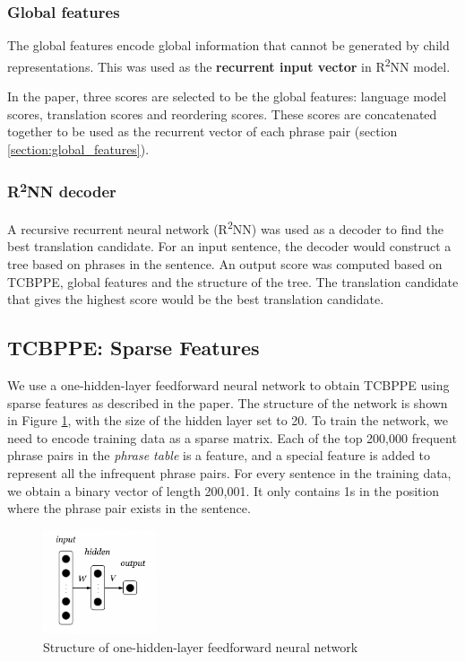 \documentclass[12pt,a4paper,twoside,openright]{report}
\begin{document}
\subsubsection{Global features}
The global features encode global information that cannot be generated by child representations. This was used as the \textbf{recurrent input vector} in R\textsuperscript{2}NN model. 

In the paper\cite{r2nn}, three scores are selected to be the global features: language model scores, translation scores and reordering scores. These scores are concatenated together to be used as the recurrent vector of each phrase pair (section \ref{section:global_features}).

\subsubsection{R\textsuperscript{2}NN decoder}
A recursive recurrent neural network (R\textsuperscript{2}NN) was used as a decoder to find the best translation candidate. For an input sentence, the decoder would construct a tree based on phrases in the sentence. An output score was computed based on TCBPPE, global features and the structure of the tree. The translation candidate that gives the highest score would be the best translation candidate.

\subsection{TCBPPE: Sparse Features} \label{section:TCBPPE_sparse}

We use a one-hidden-layer feedforward neural network to obtain TCBPPE using sparse features as described in the paper\cite{r2nn}. The structure of the network is shown in Figure \ref{fig:one_hidden_layer}, with the size of the hidden layer set to 20. To train the network, we need to encode training data as a sparse matrix. Each of the top 200,000 frequent phrase pairs in the \textit{phrase table} is a feature, and a special feature is added to represent all the infrequent phrase pairs. For every sentence in the training data, we obtain a binary vector of length 200,001. It only contains 1s in the position where the phrase pair exists in the sentence.

\begin{figure}[ht]
\centering
\includegraphics[width=0.3\textwidth]{images/one_hidden_layer.png}
\caption{Structure of one-hidden-layer feedforward neural network}
\label{fig:one_hidden_layer}
\end{figure}
\end{document}
